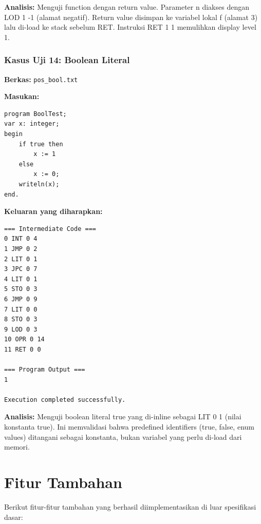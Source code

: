 \documentclass[12pt,a4paper]{article}
\begin{document}
\textbf{Analisis:} Menguji function dengan return value. Parameter n diakses dengan LOD 1 -1 (alamat negatif). Return value disimpan ke variabel lokal f (alamat 3) lalu di-load ke stack sebelum RET. Instruksi RET 1 1 memulihkan display level 1.

\subsubsection{Kasus Uji 14: Boolean Literal}

\textbf{Berkas:} \texttt{pos\_bool.txt}

\textbf{Masukan:}
\begin{lstlisting}
program BoolTest;
var x: integer;
begin
    if true then
        x := 1
    else
        x := 0;
    writeln(x);
end.
\end{lstlisting}

\textbf{Keluaran yang diharapkan:}
\begin{verbatim}
=== Intermediate Code ===
0 INT 0 4
1 JMP 0 2
2 LIT 0 1
3 JPC 0 7
4 LIT 0 1
5 STO 0 3
6 JMP 0 9
7 LIT 0 0
8 STO 0 3
9 LOD 0 3
10 OPR 0 14
11 RET 0 0

=== Program Output ===
1

Execution completed successfully.
\end{verbatim}

\textbf{Analisis:} Menguji boolean literal true yang di-inline sebagai LIT 0 1 (nilai konstanta true). Ini memvalidasi bahwa predefined identifiers (true, false, enum values) ditangani sebagai konstanta, bukan variabel yang perlu di-load dari memori.


\section{Fitur Tambahan}

Berikut fitur-fitur tambahan yang berhasil diimplementasikan di luar spesifikasi dasar:
\end{document}
